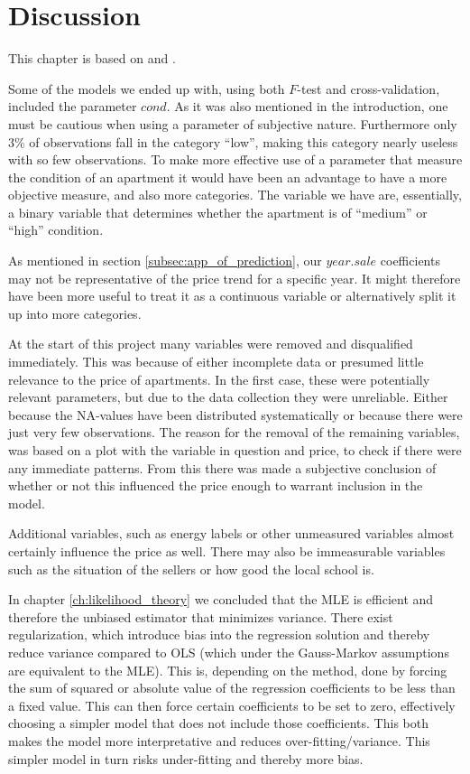 \chapter{Discussion}\label{ch:discussion}
This chapter is based on \cite{Khandelwal2018} and \cite{Hastie2008}.

Some of the models we ended up with, using both $F$-test and cross-validation, included the parameter $cond$.
As it was also mentioned in the introduction, one must be cautious when using a parameter of subjective nature.
Furthermore only 3\% of observations fall in the category ``low'', making this category nearly useless with so few observations.
To make more effective use of a parameter that measure the condition of an apartment it would have been an advantage to have a more objective measure, and also more categories.
The variable we have are, essentially, a binary variable that determines whether the apartment is of ``medium'' or ``high'' condition.

As mentioned in section \ref{subsec:app_of_prediction}, our $year.sale$ coefficients may not be representative of the price trend for a specific year. 
It might therefore have been more useful to treat it as a continuous variable or alternatively split it up into more categories.

At the start of this project many variables were removed and disqualified immediately.
This was because of either incomplete data or presumed little relevance to the price of apartments. 
In the first case, these were potentially relevant parameters, but due to the data collection they were unreliable. 
Either because the NA-values have been distributed systematically or because there were just very few observations. 
The reason for the removal of the remaining variables, was based on a plot with the variable in question and price, to check if there were any immediate patterns.
From this there was made a subjective conclusion of whether or not this influenced the price enough to warrant inclusion in the model. 

Additional variables, such as energy labels or other unmeasured variables almost certainly influence the price as well. 
There may also be immeasurable variables such as the situation of the sellers or how good the local school is.

In chapter \ref{ch:likelihood_theory} we concluded that the MLE is efficient and therefore the unbiased estimator that minimizes variance.
There exist regularization, which introduce bias into the regression solution and thereby reduce variance compared to OLS (which under the Gauss-Markov assumptions are equivalent to the MLE).
This is, depending on the method, done by forcing the sum of squared or absolute value of the regression coefficients to be less than a fixed value.
This can then force certain coefficients to be set to zero, effectively choosing a simpler model that does not include those coefficients.
This both makes the model more interpretative and reduces over-fitting/variance.
This simpler model in turn risks under-fitting and thereby more bias.

